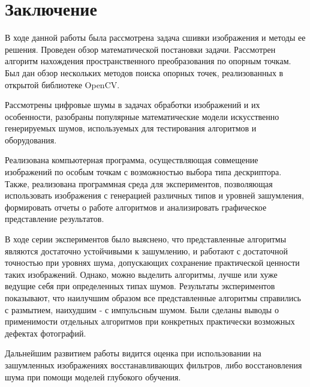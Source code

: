 {{\titleformat{\section}{\large\bfseries\centering}{\thesection}{0.5em}{\MakeUppercase}
\titleformat{\subsection}[block]{\bfseries\hspace{1em}}{\thesubsection}{0.5em}{}

\newpage
{}
{}
\section*{Заключение}
{
    В ходе данной работы была рассмотрена задача сшивки изображения и методы ее решения. Проведен обзор математической постановки задачи. Рассмотрен алгоритм нахождения пространственного преобразования по опорным точкам. Был дан обзор нескольких методов поиска опорных точек, реализованных в открытой библиотеке OpenCV.
    
    Рассмотрены цифровые шумы в задачах обработки изображений и их особенности, разобраны популярные математические модели искусственно генерируемых шумов, используемых для тестирования алгоритмов и оборудования. 
    
    Реализована компьютерная программа, осуществляющая совмещение изображений по особым точкам с возможностью выбора типа дескриптора. Также, реализована программная среда для экспериментов, позволяющая использовать изображения с генерацией различных типов и уровней зашумления, формировать отчеты о работе алгоритмов и анализировать графическое представление результатов. 
    
    В ходе серии экспериментов было выяснено, что представленные алгоритмы являются достаточно устойчивыми к зашумлению, и работают с достаточной точностью при уровнях шума, допускающих сохранение практической ценности таких изображений. Однако, можно выделить алгоритмы, лучше или хуже ведущие себя при определенных типах шумов. Результаты экспериментов показывают, что наилучшим образом все представленные алгоритмы справились с размытием, наихудшим - с импульсным шумом. Были сделаны выводы о применимости отдельных алгоритмов при конкретных практически возможных дефектах фотографий. 
    
    Дальнейшим развитием работы видится оценка при использовании на зашумленных изображениях восстанавливающих фильтров, либо восстановления шума при помощи моделей глубокого обучения.
}

}}
